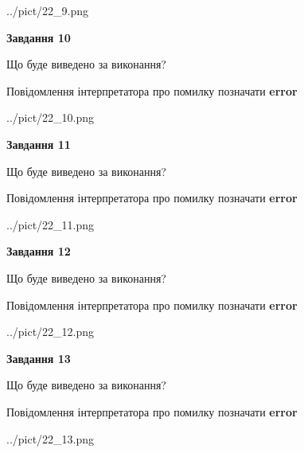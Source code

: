 \documentclass[11pt, ukrainian]{article}
\begin{document}
{\begin {large}
\begin{center}
	{../pict/22_9.png}
\end{center}
\newpage

{\begin {center}\textbf{Завдання 10}\end {center}}\par
Що буде виведено за виконання? \par
Повідомлення інтерпретатора про помилку позначати \textbf{error}

\begin{center}
	{../pict/22_10.png}
\end{center}
\newpage

{\begin {center}\textbf{Завдання 11}\end {center}}\par
Що буде виведено за виконання? \par
Повідомлення інтерпретатора про помилку позначати \textbf{error}

\begin{center}
	{../pict/22_11.png}
\end{center}
\newpage

{\begin {center}\textbf{Завдання 12}\end {center}}\par
Що буде виведено за виконання? \par
Повідомлення інтерпретатора про помилку позначати \textbf{error}

\begin{center}
	{../pict/22_12.png}
\end{center}
\newpage

{\begin {center}\textbf{Завдання 13}\end {center}}\par
Що буде виведено за виконання? \par
Повідомлення інтерпретатора про помилку позначати \textbf{error}

\begin{center}
	{../pict/22_13.png}
\end{center}
\newpage


\end{large}}
\end{document}
